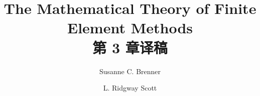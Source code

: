 \documentclass[a4paper,UTF8,12pt]{ctexart}
\title{The Mathematical Theory of Finite Element Methods\\第 3 章译稿}
\author{Susanne C. Brenner \and L. Ridgway Scott}
\date{}
\begin{document}
\maketitle
\setcounter{section}{2}
\renewcommand{\thethmcount}{\thesubsection.\arabic{thmcount}}
\renewcommand{\theequation}{\thesubsection.\arabic{equation}}
\renewcommand{\thefigure}{\thesection.\arabic{figure}}
\renewcommand{\thetable}{\thesection.\arabic{table}}

\end{document}
